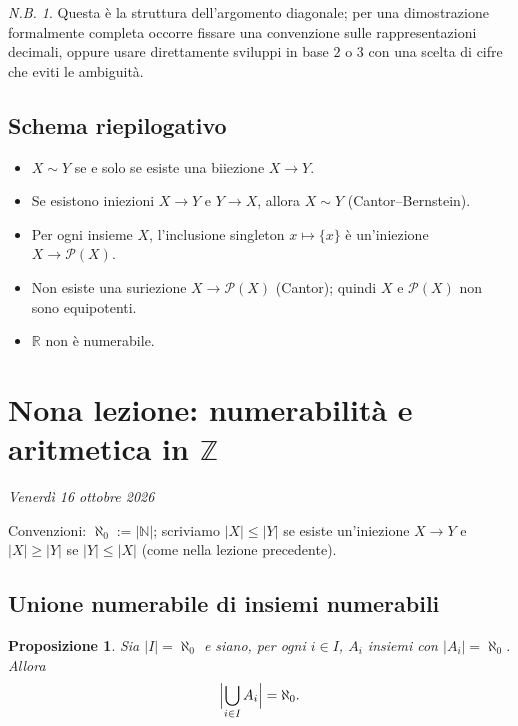 \documentclass[11pt,a4paper]{article}
\newcommand{\N}{\mathbb{N}}
\newcommand{\Z}{\mathbb{Z}}
\newcommand{\Pot}{\mathcal{P}}
\theoremstyle{definition}
\theoremstyle{plain}
\newtheorem{proposizione}[definizione]{Proposizione}
\theoremstyle{remark}
\newtheorem*{nb}{N.B.}
\begin{document}
\begin{nb}
Questa è la struttura dell'argomento diagonale; per una dimostrazione formalmente completa occorre fissare una convenzione sulle rappresentazioni decimali, oppure usare direttamente sviluppi in base $2$ o $3$ con una scelta di cifre che eviti le ambiguità.
\end{nb}

\subsection*{Schema riepilogativo}
\begin{itemize}
  \item $X\sim Y$ se e solo se esiste una biiezione $X\to Y$.
  \item Se esistono iniezioni $X\to Y$ e $Y\to X$, allora $X\sim Y$ (Cantor--Bernstein).
  \item Per ogni insieme $X$, l'inclusione singleton $x\mapsto\{x\}$ è un'iniezione $X\to\Pot(X)$.
  \item Non esiste una suriezione $X\to\Pot(X)$ (Cantor); quindi $X$ e $\Pot(X)$ non sono equipotenti.
  \item $\mathbb R$ non è numerabile.
\end{itemize}



\section{Nona lezione: numerabilità e aritmetica in $\Z$}
\textit{Venerdì 16 ottobre 2026}

Convenzioni: $\aleph_0:=|\N|$; scriviamo $|X|\le|Y|$ se esiste un'iniezione $X\to Y$ e $|X|\ge|Y|$ se $|Y|\le|X|$ (come nella lezione precedente).

\subsection{Unione numerabile di insiemi numerabili}

\begin{proposizione}\label{prop:unione}
Sia $|I|=\aleph_0$ e siano, per ogni $i\in I$, $A_i$ insiemi con $|A_i|=\aleph_0$. Allora
\[
\Bigl|\bigcup_{i\in I}A_i\Bigr|=\aleph_0 .
\]
\end{proposizione}
\end{document}
